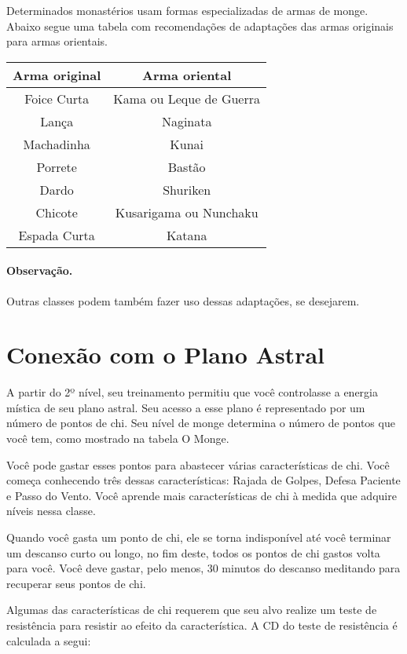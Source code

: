 \begin{multicols}{2}
Determinados monastérios usam formas especializadas de armas de monge. Abaixo
segue uma tabela com recomendações de adaptações das armas originais para armas
orientais.

\begin{center}
\begin{tabular}{c | c}
\textbf{Arma original} & \textbf{Arma oriental} \\ \hline
Foice Curta & Kama ou Leque de Guerra \\
Lança & Naginata \\
Machadinha & Kunai \\
Porrete & Bastão \\
Dardo & Shuriken \\
Chicote & Kusarigama ou Nunchaku \\
Espada Curta & Katana \\
\end{tabular}
\end{center}

\paragraph{Observação.}%

Outras classes podem também fazer uso dessas adaptações, se desejarem.

\section*{Conexão com o Plano Astral}%
\label{sec:conexao_com_o_plano_astral}

A partir do 2º nível, seu treinamento permitiu que você controlasse a energia
mística de seu plano astral. Seu acesso a esse plano é representado por um
número de pontos de chi. Seu nível de monge determina o número de pontos que
você tem, como mostrado na tabela O Monge.

Você pode gastar esses pontos para abastecer várias características de chi. Você
começa conhecendo três dessas características: Rajada de Golpes, Defesa Paciente
e Passo do Vento. Você aprende mais características de chi à medida que adquire
níveis nessa classe.

Quando você gasta um ponto de chi, ele se torna indisponível até você terminar
um descanso curto ou longo, no fim deste, todos os pontos de chi gastos volta
para você. Você deve gastar, pelo menos, 30 minutos do descanso meditando para
recuperar seus pontos de chi.

Algumas das características de chi requerem que seu alvo realize um teste de
resistência para resistir ao efeito da característica. A CD do teste de
resistência é calculada a segui:


\end{multicols}

